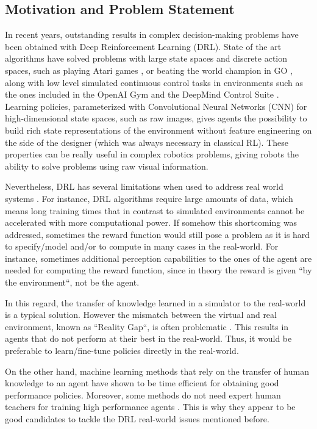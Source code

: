\begin{intro}
\section{Motivation and Problem Statement}
In  recent years, outstanding results in complex decision-making problems have been obtained with Deep Reinforcement Learning (DRL). State of the art algorithms have solved problems with large state spaces and discrete action spaces, such as playing Atari games \cite{atari}, or beating the world champion in GO \cite{Silver2016}, along with low level simulated continuous control tasks in environments such as the ones included in the OpenAI Gym \cite{brockman2016openai} and the DeepMind Control Suite \cite{tassa2018deepmind}. Learning policies, parameterized with Convolutional Neural Networks (CNN) for high-dimensional state spaces, such as raw images, gives agents the possibility to build rich state representations of the environment without feature engineering on the side of the designer (which was always necessary in classical RL). These properties can be really useful in complex robotics problems, giving robots the ability to solve problems using raw visual information. 

Nevertheless, DRL has several limitations when used to address real world systems \cite{Gu2017}. For instance, DRL algorithms require large amounts of data, which means long training times that in contrast to simulated environments cannot be accelerated with more computational power. If somehow this shortcoming was addressed, sometimes the reward function would still pose a problem as it is hard to specify/model and/or to compute in many cases in the real-world. For instance, sometimes additional perception capabilities to the ones of the agent are needed for computing the reward function, since in theory the reward is given ``by the environment``, not be the agent.

In this regard, the transfer of knowledge learned in a simulator to the real-world is a typical solution. However the mismatch between the virtual and real environment, known as ``Reality Gap``, is often problematic \cite{koos2013transferability}. This results in agents that do not perform at their best in the real-world. Thus, it would be preferable to learn/fine-tune policies directly in the real-world.

On the other hand, machine learning methods that rely on the transfer of human knowledge to an agent have shown to be time efficient for obtaining good performance policies. Moreover, some methods do not need expert human teachers for training high performance agents \cite{akrour2011preference,Knox:2009:ISA:1597735.1597738,Celemin2018AnInteractive}. This is why they appear to be good candidates to tackle the DRL real-world issues mentioned before. 


\end{intro}
